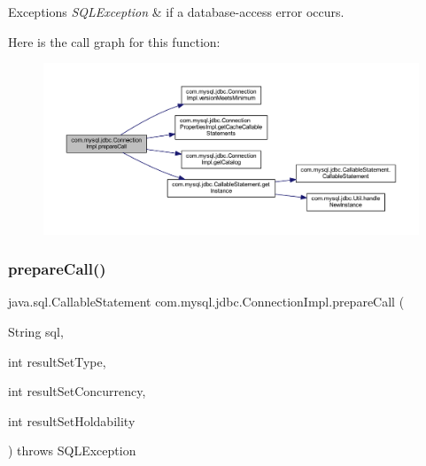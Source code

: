 \begin{DoxyExceptions}{Exceptions}
{\em S\+Q\+L\+Exception} & if a database-\/access error occurs. \\
\hline
\end{DoxyExceptions}
Here is the call graph for this function\+:\nopagebreak
\begin{figure}[H]
\begin{center}
\leavevmode
\includegraphics[width=350pt]{classcom_1_1mysql_1_1jdbc_1_1_connection_impl_ab44319ffdc136817efca3040507a1cdf_cgraph}
\end{center}
\end{figure}
\mbox{\label{classcom_1_1mysql_1_1jdbc_1_1_connection_impl_ac6d1a47de58f0636b2b921aa47f8bfa1}} 
\subsubsection{\texorpdfstring{prepare\+Call()}{prepareCall()}\hspace{0.1cm}{\footnotesize\ttfamily [3/3]}}
{\footnotesize\ttfamily java.\+sql.\+Callable\+Statement com.\+mysql.\+jdbc.\+Connection\+Impl.\+prepare\+Call (\begin{DoxyParamCaption}\item[{String}]{sql,  }\item[{int}]{result\+Set\+Type,  }\item[{int}]{result\+Set\+Concurrency,  }\item[{int}]{result\+Set\+Holdability }\end{DoxyParamCaption}) throws S\+Q\+L\+Exception}

